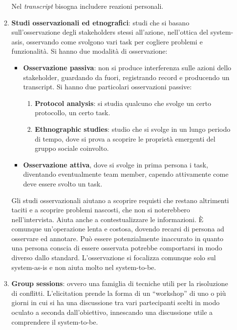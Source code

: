 \begin{itemize}
\begin{enumerate}
        Nel \textit{transcript} bisogna includere reazioni personali.
        \item \textbf{Studi osservazionali ed etnografici}: studi che si basano sull'osservazione degli stakeholders stessi all'azione, nell'ottica del system-asis, osservando come svolgono vari task per cogliere problemi e funzionalità. Si hanno due modalità di osservazione:
        \begin{itemize}
            \item \textbf{Osservazione passiva}: non si produce interferenza sulle azioni dello stakeholder, guardando da fuori, registrando record e producendo un transcript. Si hanno due particolari osservazioni passive:
            \begin{enumerate}
                \item \textbf{Protocol analysis}: si studia qualcuno che svolge un certo protocollo, un certo task.
                \item \textbf{Ethnographic studies}: studio che si svolge in un lungo periodo di tempo, dove si prova a scoprire le proprietà emergenti del gruppo sociale coinvolto.
            \end{enumerate}
            \item \textbf{Osservazione attiva}, dove si svolge in prima persona i task, diventando eventualmente team member, capendo attivamente come deve essere svolto un task.
        \end{itemize}

        Gli studi osservazionali aiutano a scoprire requisti che restano altrimenti taciti e a scoprire problemi nascosti, che non si noterebbero nell'intervista. Aiuta anche a contestualizzare le informazioni. È comunque un'operazione lenta e costosa, dovendo recarsi di persona ad osservare ed annotare. Può essere potenzialmente inaccurato in quanto una persona conscia di essere osservata potrebbe comportarsi in modo diverso dallo standard. L’osservazione si focalizza comunque solo sul system-as-is e non aiuta molto nel system-to-be.
        \item \textbf{Group sessions}: ovvero una famiglia di tecniche utili per la risoluzione di conflitti. L'elicitation prende la forma di un “workshop” di uno o più giorni in cui si ha una discussione tra vari partecipanti scelti in modo oculato a seconda dall'obiettivo, innescando una discussione utile a comprendere il system-to-be.
        

\end{enumerate}
\end{itemize}
